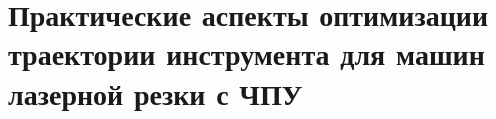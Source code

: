 \documentclass{article}
\begin{document}
\section{Практические аспекты оптимизации траектории инструмента для машин лазерной резки с ЧПУ}
\end{document}
